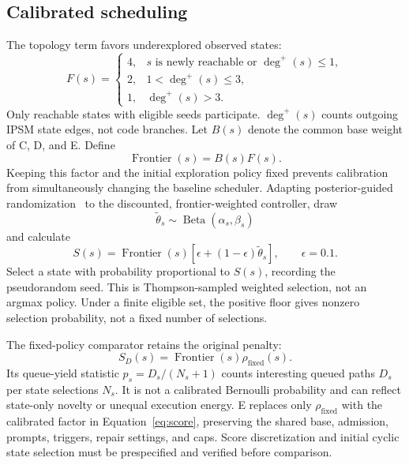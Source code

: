 \documentclass[final,5p,times,number]{elsarticle}
\begin{document}
\subsection{Calibrated scheduling}
The topology term favors underexplored observed states:
\begin{equation}
F(s)=
\begin{cases}
4,&s\text{ is newly reachable or }\deg^+(s)\leq1,\\
2,&1<\deg^+(s)\leq3,\\
1,&\deg^+(s)>3.
\end{cases}
\end{equation}
Only reachable states with eligible seeds participate. $\deg^+(s)$ counts outgoing IPSM state edges, not code branches. Let $B(s)$ denote the common base weight of C, D, and E. Define
\begin{equation}
\operatorname{Frontier}(s)=B(s)F(s).
\end{equation}
Keeping this factor and the initial exploration policy fixed prevents calibration from simultaneously changing the baseline scheduler. Adapting posterior-guided randomization~\cite{thompson1933} to the discounted, frontier-weighted controller, draw
\begin{equation}
\widetilde{\theta}_s\sim\operatorname{Beta}(\alpha_s,\beta_s)
\end{equation}
and calculate
\begin{equation}
S(s)=\operatorname{Frontier}(s)[\epsilon+(1-\epsilon)\widetilde{\theta}_s],
\qquad\epsilon=0.1.
\label{eq:score}
\end{equation}
Select a state with probability proportional to $S(s)$, recording the pseudorandom seed. This is Thompson-sampled weighted selection, not an argmax policy. Under a finite eligible set, the positive floor gives nonzero selection probability, not a fixed number of selections.

The fixed-policy comparator retains the original penalty:
\begin{equation}
S_D(s)=\operatorname{Frontier}(s)\rho_{\mathrm{fixed}}(s).
\end{equation}
Its queue-yield statistic $p_s=D_s/(N_s+1)$ counts interesting queued paths $D_s$ per state selections $N_s$. It is not a calibrated Bernoulli probability and can reflect state-only novelty or unequal execution energy. E replaces only $\rho_{\mathrm{fixed}}$ with the calibrated factor in Equation~\ref{eq:score}, preserving the shared base, admission, prompts, triggers, repair settings, and caps. Score discretization and initial cyclic state selection must be prespecified and verified before comparison.
\end{document}
